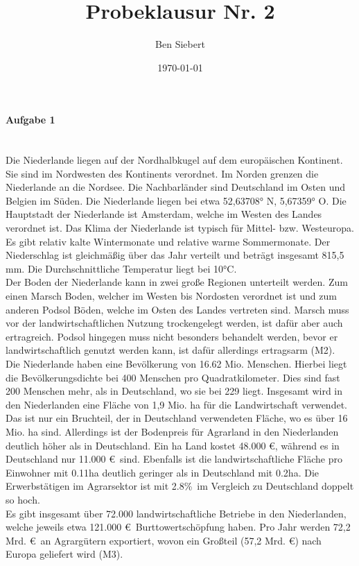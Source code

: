 \documentclass[12pt, a4paper]{report}
\begin{document}
	\title{Probeklausur Nr. 2}
	\author{Ben Siebert}
	\date{\today}
	\maketitle
	
	\paragraph{Aufgabe 1} \mbox{} \\
	Die Niederlande liegen auf der Nordhalbkugel auf dem europäischen Kontinent.
	Sie sind im Nordwesten des Kontinents verordnet.
	Im Norden grenzen die Niederlande an die Nordsee.
	Die Nachbarländer sind Deutschland im Osten und Belgien im Süden.
	Die Niederlande liegen bei etwa 52,63708° N, 5,67359° O.
	Die Hauptstadt der Niederlande ist Amsterdam, welche im Westen des Landes verordnet ist.
	Das Klima der Niederlande ist typisch für Mittel- bzw. Westeuropa.
	Es gibt relativ kalte Wintermonate und relative warme Sommermonate.
	Der Niederschlag ist gleichmäßig über das Jahr verteilt und beträgt insgesamt 815,5 mm.
	Die Durchschnittliche Temperatur liegt bei 10°C. \\
	Der Boden der Niederlande kann in zwei große Regionen unterteilt werden.
	Zum einen Marsch Boden, welcher im Westen bis Nordosten verordnet ist und zum anderen Podsol Böden, welche im Osten des Landes vertreten sind.
	Marsch muss vor der landwirtschaftlichen Nutzung trockengelegt werden, ist dafür aber auch ertragreich.
	Podsol hingegen muss nicht besonders behandelt werden, bevor er landwirtschaftlich genutzt werden kann, ist dafür allerdings ertragsarm (M2). \\
	Die Niederlande haben eine Bevölkerung von 16.62 Mio. Menschen.
	Hierbei liegt die Bevölkerungsdichte bei 400 Menschen pro Quadratkilometer.
	Dies sind fast 200 Menschen mehr, als in Deutschland, wo sie bei 229 liegt.
	Insgesamt wird in den Niederlanden eine Fläche von 1,9 Mio. ha für die Landwirtschaft verwendet.
	Das ist nur ein Bruchteil, der in Deutschland verwendeten Fläche, wo es über 16 Mio. ha sind.
	Allerdings ist der Bodenpreis für Agrarland in den Niederlanden deutlich höher als in Deutschland.
	Ein ha Land kostet 48.000 \euro, während es in Deutschland nur 11.000 \euro\ sind.
	Ebenfalls ist die landwirtschaftliche Fläche pro Einwohner mit 0.11ha deutlich geringer als in Deutschland mit 0.2ha.
	Die Erwerbstätigen im Agrarsektor ist mit 2.8\%\ im Vergleich zu Deutschland doppelt so hoch. \\
	Es gibt insgesamt über 72.000 landwirtschaftliche Betriebe in den Niederlanden, welche jeweils etwa 121.000 \euro\ Burttowertschöpfung haben.
	Pro Jahr werden 72,2 Mrd. \euro\ an Agrargütern exportiert, wovon ein Großteil (57,2 Mrd. \euro) nach Europa geliefert wird (M3).
	
\end{document}
